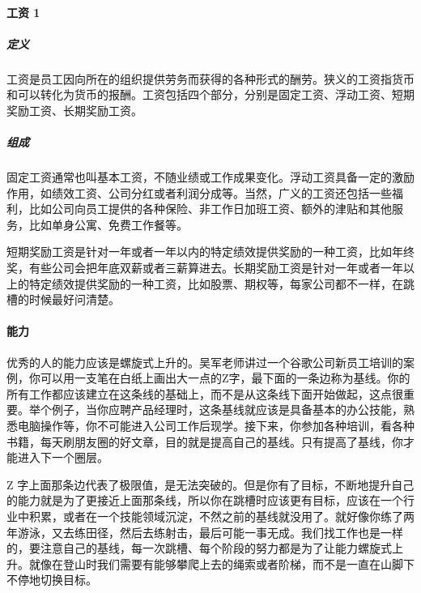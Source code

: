 \documentclass[letterpaper,11pt,english]{sphinxmanual}
\begin{document}
\paragraph{工资 1\sphinxfootnotemark[787]}
\label{\detokenize{chapter_interview/reward:id2}}%
\begin{footnotetext}[787]\sphinxAtStartFootnote
{}
%
\end{footnotetext}\ignorespaces 

\subparagraph{定义}
\label{\detokenize{chapter_interview/reward:id3}}
工资是员工因向所在的组织提供劳务而获得的各种形式的酬劳。狭义的工资指货币和可以转化为货币的报酬。工资包括四个部分，分别是固定工资、浮动工资、短期奖励工资、长期奖励工资。


\subparagraph{组成}
\label{\detokenize{chapter_interview/reward:id4}}
固定工资通常也叫基本工资，不随业绩或工作成果变化。浮动工资具备一定的激励作用，如绩效工资、公司分红或者利润分成等。当然，广义的工资还包括一些福利，比如公司向员工提供的各种保险、非工作日加班工资、额外的津贴和其他服务，比如单身公寓、免费工作餐等。

短期奖励工资是针对一年或者一年以内的特定绩效提供奖励的一种工资，比如年终奖，有些公司会把年底双薪或者三薪算进去。长期奖励工资是针对一年或者一年以上的特定绩效提供奖励的一种工资，比如股票、期权等，每家公司都不一样，在跳槽的时候最好问清楚。


\paragraph{能力}
\label{\detokenize{chapter_interview/reward:id5}}
优秀的人的能力应该是螺旋式上升的。吴军老师讲过一个谷歌公司新员工培训的案例，你可以用一支笔在白纸上画出大一点的Z字，最下面的一条边称为基线。你的所有工作都应该建立在这条线的基础上，而不是从这条线下面开始做起，这点很重要。举个例子，当你应聘产品经理时，这条基线就应该是具备基本的办公技能，熟悉电脑操作等，你不可能进入公司工作后现学。接下来，你参加各种培训，看各种书籍，每天刷朋友圈的好文章，目的就是提高自己的基线。只有提高了基线，你才能进入下一个圈层。

Z
字上面那条边代表了极限值，是无法突破的。但是你有了目标，不断地提升自己的能力就是为了更接近上面那条线，所以你在跳槽时应该更有目标，应该在一个行业中积累，或者在一个技能领域沉淀，不然之前的基线就没用了。就好像你练了两年游泳，又去练田径，然后去练射击，最后可能一事无成。我们找工作也是一样的，要注意自己的基线，每一次跳槽、每个阶段的努力都是为了让能力螺旋式上升。就像在登山时我们需要有能够攀爬上去的绳索或者阶梯，而不是一直在山脚下不停地切换目标。
\end{document}
